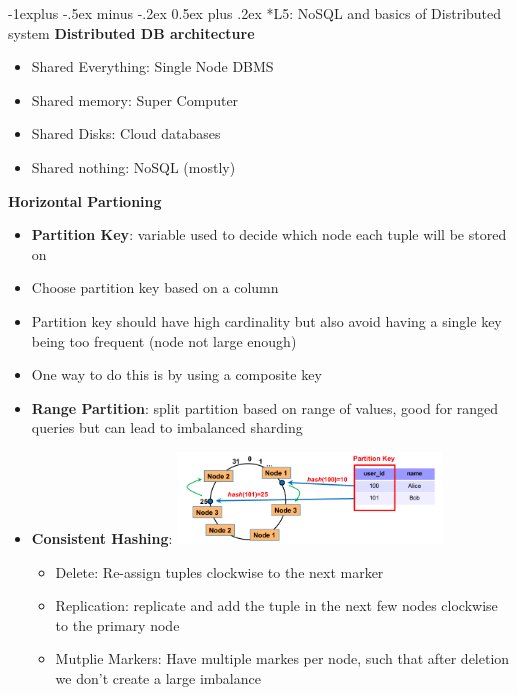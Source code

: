 \documentclass[10pt, landscape]{article}
\makeatletter
\renewcommand{\subsection}{\@startsection{subsection}{2}{0mm}%
                                {-1explus -.5ex minus -.2ex}%
                                {0.5ex plus .2ex}%
                                {\normalfont\normalsize\bfseries}}
\makeatother
\begin{document}
\begin{multicols}{4}
\subsection*{L5: NoSQL and basics of Distributed system}
\textbf{Distributed DB architecture}
\begin{itemize}
  \item Shared Everything: Single Node DBMS
  \item Shared memory: Super Computer 
  \item Shared Disks: Cloud databases 
  \item Shared nothing: NoSQL (mostly)
\end{itemize}

\textbf{Horizontal Partioning}
\begin{itemize}
  \item \textbf{Partition Key}: variable used to decide which node each tuple will be stored on 
  \item Choose partition key based on a column 
  \item Partition key should have high cardinality but also avoid having a single key being too frequent (node not large enough)
  \item One way to do this is by using a composite key
  \item \textbf{Range Partition}: split partition based on range of values, good for ranged queries but can lead to imbalanced sharding
  \item \textbf{Consistent Hashing}: 
  \includegraphics*[width=7cm]{consistent_hash.png}
  \begin{itemize}
    \item Delete: Re-assign tuples clockwise to the next marker 
    \item Replication: replicate and add the tuple in the next few nodes clockwise to the primary node 
    \item Mutplie Markers: Have multiple markes  per node, such that after deletion we don't create a large imbalance
  \end{itemize}
\end{itemize}



\end{multicols}
\end{document}
